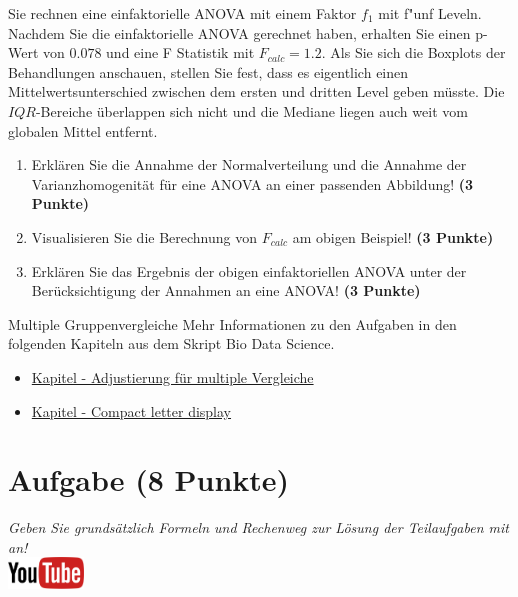 \documentclass[a4paper, 9pt]{scrartcl}\usepackage[]{graphicx}\usepackage[]{xcolor}
\begin{document}
Sie rechnen eine einfaktorielle ANOVA mit einem Faktor $f_1$ mit
f{"u}nf Leveln. Nachdem Sie die einfaktorielle ANOVA gerechnet
haben, erhalten Sie einen p-Wert von $0.078$ und eine F Statistik mit
$F_{calc} = 1.2$. Als Sie sich die Boxplots der Behandlungen anschauen,
stellen Sie fest, dass es eigentlich einen Mittelwertsunterschied zwischen
dem ersten und dritten Level geben m{\"u}sste. Die
$IQR$-Bereiche {\"u}berlappen sich nicht und die Mediane liegen auch weit vom
globalen Mittel entfernt.


\begin{enumerate}
\item Erkl{\"a}ren Sie die Annahme der Normalverteilung und die Annahme der
  Varianzhomogenit{\"a}t f{\"u}r eine ANOVA an einer passenden Abbildung! \textbf{(3 Punkte)}
\item Visualisieren Sie die Berechnung von $F_{calc}$ am obigen Beispiel!
  \textbf{(3 Punkte)}
\item Erkl{\"a}ren Sie das Ergebnis der obigen einfaktoriellen ANOVA unter der
  Ber{\"u}cksichtigung der Annahmen an eine ANOVA! \textbf{(3 Punkte)}
\end{enumerate}

 
\clearpage
\begin{graybox}{Multiple Gruppenvergleiche}
Mehr Informationen zu den Aufgaben in den folgenden Kapiteln aus dem Skript Bio Data Science.
  \begin{itemize}
  \item \href{https://jkruppa.github.io/stat-tests-theorie.html}{Kapitel - Adjustierung für multiple Vergleiche}
  \item \href{https://jkruppa.github.io/stat-tests-posthoc.html}{Kapitel - Compact letter display}
  \end{itemize}
\end{graybox}
\clearpage

\section{Aufgabe \hfill (8 Punkte)}

\textit{Geben Sie grunds{\"a}tzlich Formeln und Rechenweg zur L{\"o}sung der
  Teilaufgaben mit an!} \\[1Ex]

 \hfill\href{https://youtu.be/hr_jPd1hpKY}{\includegraphics[width =
   2cm]{img/youtube}}\\[1Ex]
\end{document}

